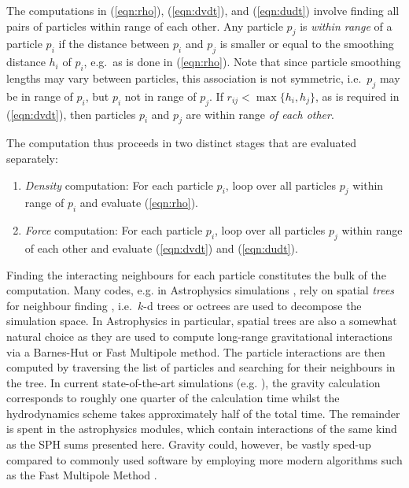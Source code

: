 \documentclass{sig-alternate-05-2015}
\newcommand{\eqn}[1] {(\ref{eqn:#1})}
\begin{document}
The computations in \eqn{rho}, \eqn{dvdt}, and \eqn{dudt} involve finding all
pairs of particles within range of each other.  Any particle $p_j$ is {\em
  within range} of a particle $p_i$ if the distance between $p_i$ and $p_j$ is
smaller or equal to the smoothing distance $h_i$ of $p_i$, e.g.~as is done in
\eqn{rho}.  Note that since particle smoothing lengths may vary between
particles, this association is not symmetric, i.e.~$p_j$ may be in range of
$p_i$, but $p_i$ not in range of $p_j$.  If $r_{ij} < \max\{h_i,h_j\}$, as is
required in \eqn{dvdt}, then particles $p_i$ and $p_j$ are within range {\em of
each other}.

The computation thus proceeds in two distinct stages that are evaluated
separately:
\begin{enumerate}
    \item {\em Density} computation: For each particle $p_i$,
        loop over all particles $p_j$ within range of $p_i$ and evaluate
        \eqn{rho}.
    \item {\em Force} computation: For each particle $p_i$,
        loop over all particles $p_j$
        within range of each other and evaluate \eqn{dvdt} and \eqn{dudt}.
\end{enumerate}

Finding the interacting neighbours for each particle constitutes the
bulk of the computation.  Many codes, e.g. in Astrophysics simulations
\cite{Gingold1977}, rely on spatial {\em trees} for neighbour finding
\cite{Gingold1977,Hernquist1989,Springel2005,Wadsley2004}, i.e.~$k$-d
trees \cite{Bentley1975} or octrees \cite{Meagher1982} are used to
decompose the simulation space.  In Astrophysics in particular,
spatial trees are also a somewhat natural choice as they are used to
compute long-range gravitational interactions via a Barnes-Hut
\cite{Barnes1986} or Fast Multipole \cite{Carrier1988} method.  The
particle interactions are then computed by traversing the list of
particles and searching for their neighbours in the tree.  In current
state-of-the-art simulations (e.g. \cite{Schaye2015}), the gravity
calculation corresponds to roughly one quarter of the calculation time
whilst the hydrodynamics scheme takes approximately half of the
total time. The remainder is spent in the astrophysics modules, which
contain interactions of the same kind as the SPH sums presented
here. Gravity could, however, be vastly sped-up compared to commonly
used software by employing more modern algorithms such as the Fast
Multipole Method \cite{Carrier1988}.
\end{document}
